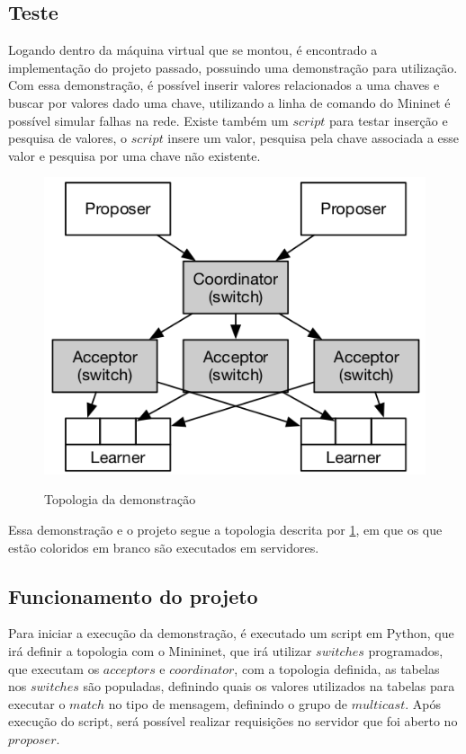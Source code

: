 \documentclass[12pt,
openright, 
oneside,
a4paper,
brazil]{facom-ufu-abntex2}
\theoremstyle{definition}
\begin{document}
\subsection{Teste}

Logando dentro da máquina virtual que se montou, é encontrado a implementação do projeto
passado, possuindo uma demonstração para utilização. Com essa demonstração, é possível
inserir valores relacionados a uma chaves e buscar por valores dado uma chave, utilizando
a linha de comando do Mininet é possível simular falhas na rede. Existe também um $script$
para testar inserção e pesquisa de valores, o $script$ insere um valor, pesquisa pela chave
associada a esse valor e pesquisa por uma chave não existente.

\begin{figure}[h]
    \caption{Topologia da demonstração}
    \centering
    \includegraphics[scale=0.8]{images/arq.png}
    \label{fig:demo-topo}
\end{figure}

Essa demonstração e o projeto segue a topologia descrita por \ref{fig:demo-topo}, em que os
que estão coloridos em branco são executados em servidores.

\subsection{Funcionamento do projeto}
Para iniciar a execução da demonstração, é executado um script em Python, que irá definir a
topologia com o Minininet, que irá utilizar $switches$ programados, que executam os $acceptors$
e $coordinator$, com a topologia definida, as tabelas nos $switches$ são populadas, definindo
quais os valores utilizados na tabelas para executar o $match$ no tipo de mensagem, definindo o
grupo de $multicast$. Após execução do script, será possível realizar requisições no servidor
que foi aberto no $proposer$.
\end{document}
